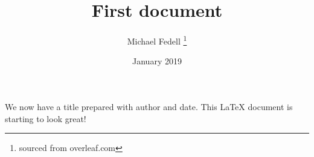 \documentclass[12pt, letterpaper]{article}
\title{First document}
\author{Michael Fedell \thanks{sourced from overleaf.com}}
\date{January 2019}
\begin{document}
\maketitle
We now have a title prepared with author and date.
This \LaTeX{} document is starting to look great!
\end{document}
